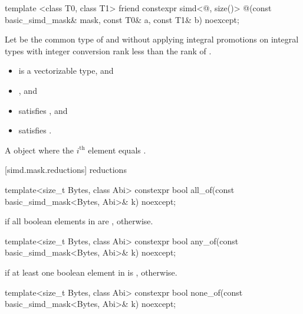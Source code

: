 \begin{itemdecl}
template <class T0, class T1>
  friend constexpr simd<@\seebelow@, size()>
    @\simdselect@(const basic_simd_mask& mask, const T0& a, const T1& b) noexcept;
\end{itemdecl}

\begin{itemdescr}
  \pnum Let  be the common type of  and  without
  applying integral promotions on integral types with integer conversion rank
  less than the rank of .

  \pnum\constraints
  \begin{itemize}
    \item {} is a vectorizable type, and
    \item {}, and
    \item {} satisfies , and
    \item {} satisfies .
  \end{itemize}

  \pnum\returns
  A  object where the $i^\text{th}$ element equals  \foralli.
\end{itemdescr}

[simd.mask.reductions]{ reductions}

\begin{itemdecl}
template<size_t Bytes, class Abi>
  constexpr bool all_of(const basic_simd_mask<Bytes, Abi>& k) noexcept;
\end{itemdecl}

\begin{itemdescr}
  \pnum\returns
   if all boolean elements in  are ,  otherwise.
\end{itemdescr}

\begin{itemdecl}
template<size_t Bytes, class Abi>
  constexpr bool any_of(const basic_simd_mask<Bytes, Abi>& k) noexcept;
\end{itemdecl}

\begin{itemdescr}
  \pnum\returns
   if at least one boolean element in  is , 
  otherwise.
\end{itemdescr}

\begin{itemdecl}
template<size_t Bytes, class Abi>
  constexpr bool none_of(const basic_simd_mask<Bytes, Abi>& k) noexcept;
\end{itemdecl}

